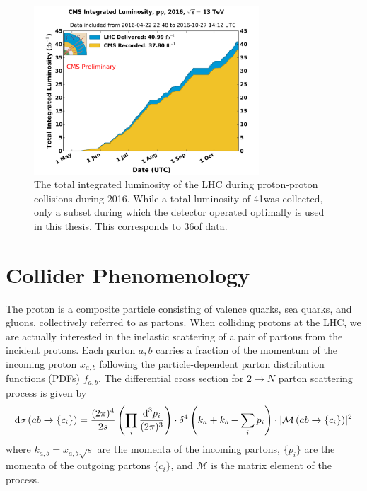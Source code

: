 \begin{figure}[htbp]
  \centering
  \includegraphics[width=0.75\textwidth]{Collider/Figures/lumi_2016.pdf}
  \caption{
    The total integrated luminosity of the LHC during proton-proton collisions during 2016.\cite{}
    While a total luminosity of 41\fbinv was collected, only a subset during which the detector operated optimally is used in this thesis. This corresponds to 36\fbinv of data.
  }
  \label{fig:lumi}
\end{figure}

\section{Collider Phenomenology}

The proton is a composite particle consisting of valence quarks, sea quarks, and gluons, collectively referred to as partons.
When colliding protons at the LHC, we are actually interested in the inelastic scattering of a pair of partons from the incident protons.
Each parton $a,b$ carries a fraction of the momentum of the incoming proton $x_{a,b}$ following the particle-dependent parton distribution functions (PDFs) $f_{a,b}$.
The differential cross section for $2\rightarrow N$ parton scattering process is given by
\begin{equation}
  \text{d}\sigma \left(ab \rightarrow \{c_i\} \right) =
  \frac{(2\pi)^4}{2s} \left( \prod_i \frac{\text{d}^3 p_i}{(2\pi)^3} \right)
  \cdot \delta^4 \left(k_a + k_b - \sum_i p_i \right)
  \cdot \lvert  \mathcal{M} \left(ab \rightarrow \{c_i\} \right) \rvert^2
\end{equation}
where $k_{a,b} = x_{a,b} \sqrt{s}$ are the momenta of the incoming partons, $\{p_i\}$ are the momenta of the outgoing partons $\{c_i\}$, and $\mathcal{M}$ is the matrix element of the process.

